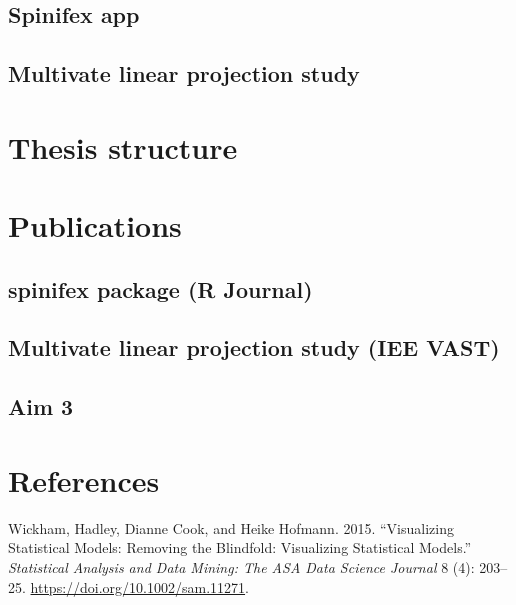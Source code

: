 \documentclass[11,]{article}
\begin{document}
\hypertarget{spinifex-app}{%
\subsection{Spinifex app}\label{spinifex-app}}

\hypertarget{multivate-linear-projection-study}{%
\subsection{Multivate linear projection study}\label{multivate-linear-projection-study}}

\hypertarget{thesis-structure}{%
\section{Thesis structure}\label{thesis-structure}}

\hypertarget{publications}{%
\section{Publications}\label{publications}}

\hypertarget{spinifex-package-r-journal}{%
\subsection{spinifex package (R Journal)}\label{spinifex-package-r-journal}}

\hypertarget{multivate-linear-projection-study-iee-vast}{%
\subsection{Multivate linear projection study (IEE VAST)}\label{multivate-linear-projection-study-iee-vast}}

\hypertarget{aim-3}{%
\subsection{Aim 3}\label{aim-3}}

\hypertarget{references}{%
\section*{References}\label{references}}

\hypertarget{refs}{}
\leavevmode\hypertarget{ref-wickham_visualizing_2015}{}%
Wickham, Hadley, Dianne Cook, and Heike Hofmann. 2015. ``Visualizing Statistical Models: Removing the Blindfold: Visualizing Statistical Models.'' \emph{Statistical Analysis and Data Mining: The ASA Data Science Journal} 8 (4): 203--25. \url{https://doi.org/10.1002/sam.11271}.
\end{document}
